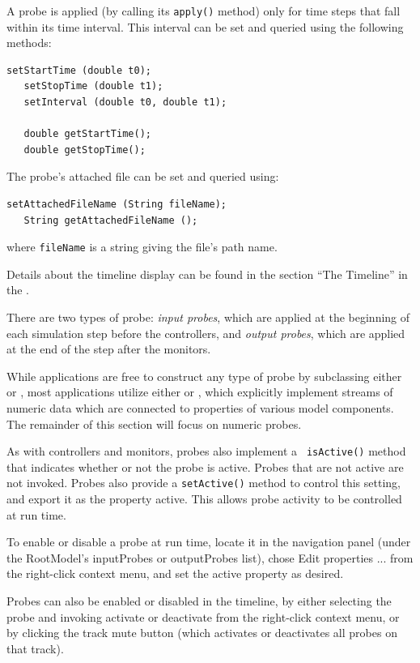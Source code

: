 A probe is applied (by calling its {\tt apply()} method) only for time
steps that fall within its time interval. This interval can be set and
queried using the following methods:
%
\begin{lstlisting}[]
   setStartTime (double t0);
   setStopTime (double t1);
   setInterval (double t0, double t1);
 
   double getStartTime();
   double getStopTime();
\end{lstlisting}
%
The probe's attached file can be set and queried using:
%
\begin{lstlisting}[]
   setAttachedFileName (String fileName);
   String getAttachedFileName ();
\end{lstlisting}
%
where {\tt fileName} is a string giving the file's path name.

Details about the timeline display can be found in
the section ``The Timeline'' in the
.

There are two types of probe: {\it input probes}, which are applied at
the beginning of each simulation step before the controllers, and {\it
output probes}, which are applied at the end of the step after the
monitors.

While applications are free to construct any type of probe by
subclassing either  or
, most applications
utilize either  or
, which
explicitly implement streams of numeric data which are connected to
properties of various model components.  The remainder of this section
will focus on numeric probes.

As with controllers and monitors, probes also implement a {\tt
isActive()} method that indicates whether or not the probe is active.
Probes that are not active are not invoked. Probes also provide a
{\tt setActive()} method to control this setting, and export it as the
property {\sf active}. This allows probe activity to be controlled at
run time.

\begin{sideblock}
To enable or disable a probe at run time, locate it in the navigation
panel (under the RootModel's {\sf inputProbes} or {\sf outputProbes}
list), chose {\sf Edit properties ...} from the right-click context
menu, and set the {\sf active} property as desired.

Probes can also be enabled or disabled in the timeline, by either
selecting the probe and invoking {\sf activate} or {\sf deactivate}
from the right-click context menu, or by clicking the track {\sf mute}
button (which activates or deactivates all probes on that track).
\end{sideblock}

